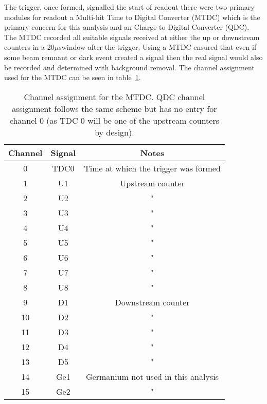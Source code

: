 \documentclass[]{article}
\newcommand{\ms}{$\mu$s}
\begin{document}
The trigger, once formed, signalled the start of readout there were two primary modules for readout a Multi-hit Time to Digital Converter (MTDC) which is the primary concern for this analysis and an Charge to Digital Converter (QDC). The MTDC recorded all suitable signals received at either the up or downstream counters in a 20\ms window after the trigger. Using a MTDC ensured that even if some beam remnant or dark event created a signal then the real signal would also be recorded and determined with background removal. The channel assignment used for the MTDC can be seen in table~\ref{tab:mtdc_ch}.
\begin{table}
	\begin{center}
	\begin{tabular}{c|c|c}
		Channel & Signal & Notes\\
		\hline
		0  & TDC0 & Time at which the trigger was formed \\
		1  & U1   & Upstream counter                     \\
		2  & U2   & "                                    \\
		3  & U3   & "                                    \\
		4  & U4   & "                                    \\
		5  & U5   & "                                    \\
		6  & U6   & "                                    \\
		7  & U7   & "                                    \\
		8  & U8   & "                                    \\
		9  & D1   & Downstream counter                   \\
		10 & D2   & "                                    \\
		11 & D3   & "                                    \\
		12 & D4   & "                                    \\
		13 & D5   & "                                    \\
		14 & Ge1  & Germanium not used in this analysis  \\
		15 & Ge2  & "                                    \\
	\end{tabular}
	\end{center}
	\caption{Channel assignment for the MTDC. QDC channel assignment follows the same scheme but has no entry for channel 0 (as TDC 0 will be one of the upstream counters by design).}
	\label{tab:mtdc_ch}
\end{table}
\end{document}
